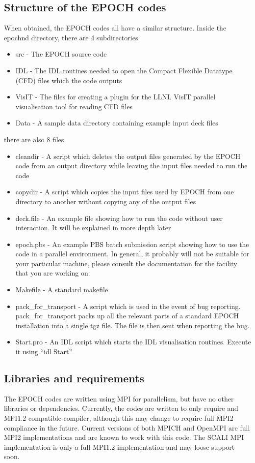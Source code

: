 \documentclass[12pt]{article}
\begin{document}
\subsection{Structure of the EPOCH codes}
When obtained, the EPOCH codes all have a similar structure. Inside the epoch{n}d directory, there are 4 subdirectories
\begin{itemize}
\item src - The EPOCH source code
\item IDL - The IDL routines needed to open the Compact Flexible Datatype (CFD) files which the code outputs
\item VisIT - The files for creating a plugin for the LLNL VisIT parallel visualisation tool for reading CFD files
\item Data - A sample data directory containing example input deck files
\end{itemize}
there are also 8 files
\begin{itemize}
\item cleandir - A script which deletes the output files generated by the EPOCH code from an output directory while leaving the input files needed to run the code
\item copydir - A script which copies the input files used by EPOCH from one directory to another without copying any of the output files
\item deck.file - An example file showing how to run the code without user interaction. It will be explained in more depth later
\item epoch.pbs - An example PBS batch submission script showing how to use the code in a parallel environment. In general, it probably will not be suitable for your particular machine, please consult the documentation for the facility that you are working on.
\item Makefile - A standard makefile
\item pack\_for\_transport - A script which is used in the event of bug reporting. pack\_for\_transport packs up all the relevant parts of a standard EPOCH installation into a single tgz file. The file is then sent when reporting the bug.
\item Start.pro - An IDL script which starts the IDL visualisation routines. Execute it using ``idl Start''
\end{itemize}

\subsection{Libraries and requirements}
The EPOCH codes are written using MPI for parallelism, but have no other libraries or dependencies. Currently, the codes are written to only require and MPI1.2 compatible compiler, although this may change to require full MPI2 compliance in the future. Current versions of both MPICH and OpenMPI are full MPI2 implementations and are known to work with this code. The SCALI MPI implementation is only a full MPI1.2 implementation and may loose support soon.\\
\end{document}

